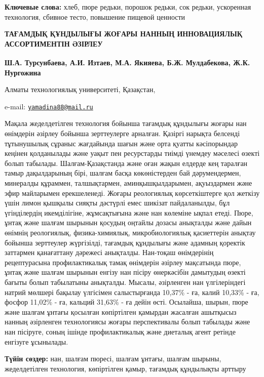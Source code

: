 {\bfseries Ключевые слова:} хлеб, пюре редьки, порошок редьки, сок редьки,
ускоренная технология, сбивное тесто, повышение пищевой ценности

\begin{articleheader}
{\bfseries ТАҒАМДЫҚ ҚҰНДЫЛЫҒЫ ЖОҒАРЫ НАННЫҢ ИННОВАЦИЯЛЫҚ АССОРТИМЕНТІН ӘЗІРЛЕУ}

{\bfseries
Ш.А. Турсунбаева,
А.И. Изтаев,
М.А. Якияева\textsuperscript{\envelope },
Б.Ж. Мулдабекова,
Ж.К. Нургожина
}
\end{articleheader}

\begin{affiliation}
Алматы технологиялық университеті, Қазақстан,

e-mail: \href{mailto:yamadina88@mail.ru}{\nolinkurl{yamadina88@mail.ru}}
\end{affiliation}

Мақала жеделдетілген технология бойынша тағамдық құндылығы жоғары нан
өнімдерін әзірлеу бойынша зерттеулерге арналған. Қазіргі нарықта
белсенді тұтынушылық сұраныс жағдайында шағын және орта қуатты
кәсіпорындар кеңінен қолданылады және уақыт пен ресурстарды тиімді
үнемдеу мәселесі өзекті болып табылады. Шалғам-Қазақстанда және оған
жақын елдерде кең таралған тамыр дақылдарының бірі, шалғам басқа
көкөністерден бай дәрумендермен, минералды құраммен, талшықтармен,
аминқышқылдарымен, ақуыздармен және эфир майларымен ерекшеленеді. Жоғары
реологиялық көрсеткіштерге қол жеткізу үшін лимон қышқылы сияқты
дәстүрлі емес шикізат пайдаланылды, бұл үгінділердің икемділігіне,
жұмсақтығына және нан көлеміне ықпал етеді. Пюре, ұнтақ және шалғам
шырынын қосудың оңтайлы дозасы анықталды және дайын өнімнің реологиялық,
физика-химиялық, микробиологиялық қасиеттерін анықтау бойынша зерттеулер
жүргізілді, тағамдық құндылығы және адамның қоректік заттармен
қанағаттану дәрежесі анықталды. Нан-тоқаш өнімдерінің рецептурасына
профилактикалық тамақ өнімдерін әзірлеу мақсатында пюре, ұнтақ және
шалғам шырынын енгізу нан пісіру өнеркәсібін дамытудың өзекті бағыты
болып табылатыны анықталды. Мысалы, әзірленген нан үлгілеріндегі натрий
мөлшері бақылау үлгісімен салыстырғанда 10,37\% - ға, калий 10,33\% -
ға, фосфор 11,02\% - ға, кальций 31,63\% - ға дейін өсті. Осылайша,
шырын, пюре және шалғам ұнтағы қосылған көпіртілген қамырдан жасалған
ашытқысыз нанның әзірленген технологиясы жоғары перспективалы болып
табылады және нан пісіруге, соның ішінде профилактикалық және диеталық
агент ретінде енгізуге ұсынылады.

{\bfseries Түйін сөздер:} нан, шалғам пюресі, шалғам ұнтағы, шалғам шырыны,
жеделдетілген технология, көпіртілген қамыр, тағамдық құндылықты арттыру

